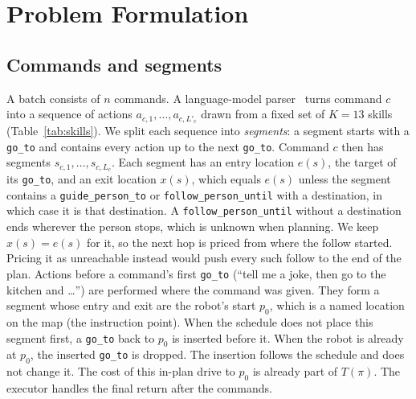 \documentclass[conference]{IEEEtran}
\newcommand{\todo}[1]{}
\newcommand{\todo}[1]{\textcolor{red}{[TODO: #1]}}
\newcommand{\code}[1]{\texttt{#1}}
\begin{document}
\section{Problem Formulation}\label{sec:problem}

\subsection{Commands and segments}
A batch consists of $n$ commands. A language-model parser~\todo{cite or
describe BAML schema} turns command $c$ into a sequence of actions
$a_{c,1},\dots,a_{c,L'_c}$ drawn from a fixed set of $K=13$ skills
(Table~\ref{tab:skills}). We split each sequence into \emph{segments}: a segment
starts with a \code{go\_to} and contains every action up to the next
\code{go\_to}. Command $c$ then has segments $s_{c,1},\dots,s_{c,L_c}$. Each
segment has an entry location $e(s)$, the target of its \code{go\_to}, and an
exit location $x(s)$, which equals $e(s)$ unless the segment contains a
\code{guide\_person\_to} or \code{follow\_person\_until} with a destination, in
which case it is that destination. A \code{follow\_person\_until} without a
destination ends wherever the person stops, which is unknown when planning. We
keep $x(s)=e(s)$ for it, so the next hop is priced from where the follow
started. Pricing it as unreachable instead would push every such follow to the
end of the plan. Actions before a command's first \code{go\_to}
(``tell me a joke, then go to the kitchen and \ldots'') are performed where the
command was given. They form a segment whose entry and exit are the robot's
start $p_0$, which is a named location on the map (the instruction point).
When the schedule does not place this segment first, a \code{go\_to} back to
$p_0$ is inserted before it. When the robot is already at $p_0$, the inserted
\code{go\_to} is dropped. The insertion follows the schedule and does not
change it. The cost of this in-plan drive to $p_0$ is already part of
$T(\pi)$. The executor handles the final return after the commands.
\end{document}
